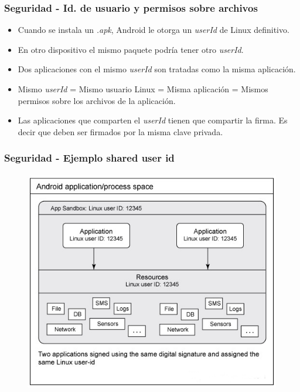 \begin{frame}
  \frametitle{Seguridad - Id. de usuario y permisos sobre archivos}
  \begin{itemize}
    \item Cuando se instala un \textit{.apk}, Android le otorga un \textit{userId} de Linux definitivo.
    
    \item En otro dispositivo el mismo paquete podría tener otro \textit{userId}.
    
    \item Dos aplicaciones con el mismo \textit{userId} son tratadas como la misma aplicación.
    
    \item Mismo \textit{userId} = Mismo usuario Linux = Misma aplicación = Mismos permisos sobre los archivos de la aplicación.
    
    \item Las aplicaciones que comparten el \textit{userId} tienen que compartir la firma. Es decir que deben ser firmados por la misma clave privada.        
  \end{itemize}
\end{frame}

\begin{frame}
  \frametitle{Seguridad - Ejemplo shared user id}
  \begin{figure}
    \centering
    \includegraphics[scale=0.4]{images/two-same-apps.jpg}
  \end{figure}
\end{frame}

